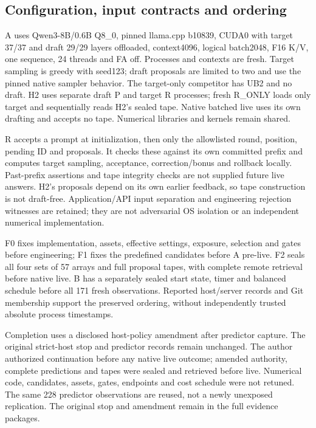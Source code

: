 \subsection{Configuration, input contracts and ordering}
A uses Qwen3-8B/0.6B Q8\_0, pinned llama.cpp b10839, CUDA0 with target 37/37 and draft 29/29 layers offloaded, context4096, logical batch2048, F16 K/V, one sequence, 24 threads and FA off. Processes and contexts are fresh. Target sampling is greedy with seed123; draft proposals are limited to two and use the pinned native sampler behavior. The target-only competitor has UB2 and no draft. H2 uses separate draft P and target R processes; fresh R\_ONLY loads only target and sequentially reads H2's sealed tape. Native batched live uses its own drafting and accepts no tape. Numerical libraries and kernels remain shared.

R accepts a prompt at initialization, then only the allowlisted round, position, pending ID and proposals. It checks these against its own committed prefix and computes target sampling, acceptance, correction/bonus and rollback locally. Past-prefix assertions and tape integrity checks are not supplied future live answers. H2's proposals depend on its own earlier feedback, so tape construction is not draft-free. Application/API input separation and engineering rejection witnesses are retained; they are not adversarial OS isolation or an independent numerical implementation.

F0 fixes implementation, assets, effective settings, exposure, selection and gates before engineering; F1 fixes the predefined candidates before A pre-live. F2 seals all four sets of 57 arrays and full proposal tapes, with complete remote retrieval before native live. B has a separately sealed start state, timer and balanced schedule before all 171 fresh observations. Reported host/server records and Git membership support the preserved ordering, without independently trusted absolute process timestamps.

Completion uses a disclosed host-policy amendment after predictor capture. The original strict-host stop and predictor records remain unchanged. The author authorized continuation before any native live outcome; amended authority, complete predictions and tapes were sealed and retrieved before live. Numerical code, candidates, assets, gates, endpoints and cost schedule were not retuned. The same 228 predictor observations are reused, not a newly unexposed replication. The original stop and amendment remain in the full evidence packages.

